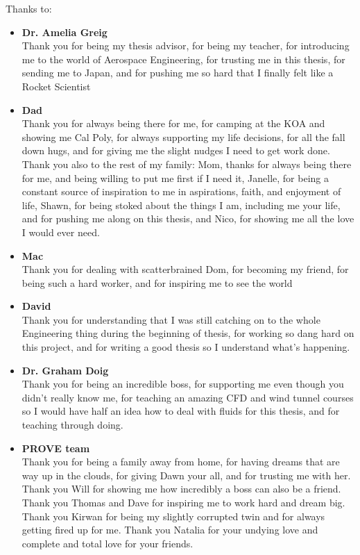 \noindent
Thanks to:
\begin{itemize}
    \item \textbf{Dr. Amelia Greig} \\
    Thank you for being my thesis advisor, for being my teacher, for introducing me to the world of Aerospace Engineering, for trusting me in this thesis, for sending me to Japan, and for pushing me so hard that I finally felt like a Rocket Scientist
    \item \textbf{Dad} \\
    Thank you for always being there for me, for camping at the KOA and showing me Cal Poly, for always supporting my life decisions, for all the fall down hugs, and for giving me the slight nudges I need to get work done. Thank you also to the rest of my family: Mom, thanks for always being there for me, and being willing to put me first if I need it, Janelle, for being a constant source of inspiration to me in aspirations, faith, and enjoyment of life, Shawn, for being stoked about the things I am, including me your life, and for pushing me along on this thesis, and Nico, for showing me all the love I would ever need.
    \item \textbf{Mac} \\
    Thank you for dealing with scatterbrained Dom, for becoming my friend, for being such a hard worker, and for inspiring me to see the world
    \item \textbf{David}\\
    Thank you for understanding that I was still catching on to the whole Engineering thing during the beginning of thesis, for working so dang hard on this project, and for writing a good thesis so I understand what's happening. 
    \item  \textbf{Dr. Graham Doig}\\
    Thank you for being an incredible boss, for supporting me even though you didn't really know me, for teaching an amazing CFD and wind tunnel courses so I would have half an idea how to deal with fluids for this thesis, and for teaching through doing.
    \item \textbf{PROVE team}\\
    Thank you for being a family away from home, for having dreams that are way up in the clouds, for giving Dawn your all, and for trusting me with her. Thank you Will for showing me how incredibly a boss can also be a friend. Thank you Thomas and Dave for inspiring me to work hard and dream big. Thank you Kirwan for being my slightly corrupted twin and for always getting fired up for me. Thank you Natalia for your undying love and complete and total love for your friends.

\end{itemize}
